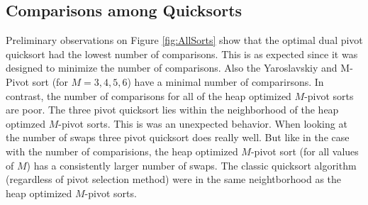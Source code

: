 	\subsection{Comparisons among Quicksorts}
	
		Preliminary observations on Figure \ref{fig:AllSorts} show that the optimal dual pivot quicksort had the lowest number of comparisons.
		This is as expected since it was designed to minimize the number of comparisons.
		Also the Yaroslavskiy and M-Pivot sort (for $M=3,4,5,6$) have a minimal number of
		comparirsons.
		In contrast, the number of comparisons for all of the heap optimized $M$-pivot sorts are poor.
		The three pivot quicksort lies within the neighborhood of the heap optimzed $M$-pivot sorts.
		This is was an unexpected behavior.
		When looking at the number of swaps three pivot quicksort does really well.
		But like in the case with the number of comparisions, the heap optimized $M$-pivot sort
		(for all values of $M$) has a consistently larger number of swaps.
		The classic quicksort algorithm (regardless of pivot selection method)
		were in the same neightborhood as the heap optimized $M$-pivot sorts.
		
		

		
